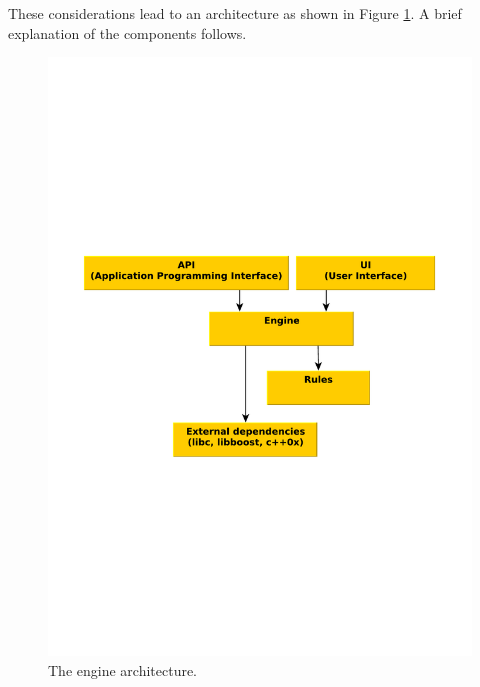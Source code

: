 These considerations lead to an architecture as shown in Figure \ref{figure:design:engine:arch}. A brief explanation of the components follows.
\begin{figure}[!h]
\centering
	\includegraphics[scale=.4, clip=true, trim=2cm 10cm 2cm 10cm]{img/engine_architecture}
	\caption{\label{figure:design:engine:arch}The engine architecture.}
\end{figure}

